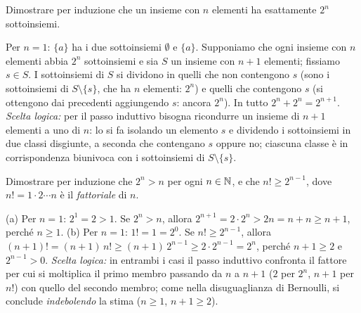 \begin{esercizio}
Dimostrare per induzione che un insieme con $n$ elementi ha esattamente $2^{n}$
sottoinsiemi.
\begin{soluzione}
Per $n=1$: $\{a\}$ ha i due sottoinsiemi $\emptyset$ e $\{a\}$. Supponiamo che ogni
insieme con $n$ elementi abbia $2^{n}$ sottoinsiemi e sia $S$ un insieme con $n+1$
elementi; fissiamo $s\in S$. I sottoinsiemi di $S$ si dividono in quelli che non
contengono $s$ (sono i sottoinsiemi di $S\setminus\{s\}$, che ha $n$ elementi: $2^{n}$)
e quelli che contengono $s$ (si ottengono dai precedenti aggiungendo $s$: ancora
$2^{n}$). In tutto $2^{n}+2^{n}=2^{n+1}$. \emph{Scelta logica:} per il passo induttivo
bisogna ricondurre un insieme di $n+1$ elementi a uno di $n$: lo si fa isolando un
elemento $s$ e dividendo i sottoinsiemi in due classi disgiunte, a seconda che
contengano $s$ oppure no; ciascuna classe è in corrispondenza biunivoca con i
sottoinsiemi di $S\setminus\{s\}$.
\end{soluzione}
\end{esercizio}

\begin{esercizio}
Dimostrare per induzione che $2^{n}>n$ per ogni $n\in\mathbb{N}$, e che $n!\ge2^{n-1}$, dove
$n!=1\cdot2\cdots n$ è il \emph{fattoriale} di $n$.
\begin{soluzione}
(a) Per $n=1$: $2^{1}=2>1$. Se $2^{n}>n$, allora $2^{n+1}=2\cdot2^{n}>2n=n+n\ge n+1$,
perché $n\ge1$. (b) Per $n=1$: $1!=1=2^{0}$. Se $n!\ge2^{n-1}$, allora
$(n+1)!=(n+1)\,n!\ge(n+1)\,2^{n-1}\ge2\cdot2^{n-1}=2^{n}$, perché $n+1\ge2$ e
$2^{n-1}>0$. \emph{Scelta logica:} in entrambi i casi il passo induttivo confronta il
fattore per cui si moltiplica il primo membro passando da $n$ a $n+1$ ($2$ per $2^{n}$,
$n+1$ per $n!$) con quello del secondo membro; come nella disuguaglianza di Bernoulli,
si conclude \emph{indebolendo} la stima ($n\ge1$, $n+1\ge2$).
\end{soluzione}
\end{esercizio}
